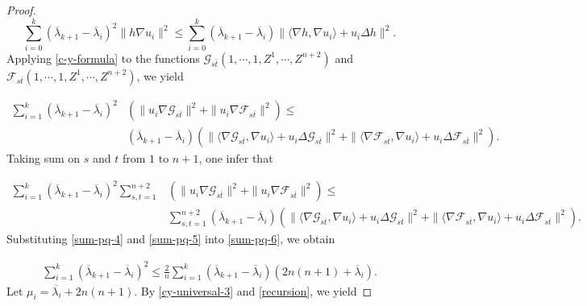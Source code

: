 \documentclass[12pt]{article}
\numberwithin{equation}{section}
\begin{document}
\begin{proof}
\begin{equation}\label{c-y-formula}\sum^{k}_{i=0}(\overline{\lambda}_{k+1}-\overline{\lambda}_{i})^{2}\|h\nabla u_{i}\|^{2}\leq\sum^{k}_{i=0}
(\overline{\lambda}_{k+1}-\overline{\lambda}_{i})\|\langle\nabla h,\nabla u_{i}\rangle+u_{i}\Delta h\|^{2}.\end{equation}
Applying \eqref{c-y-formula} to the functions $\mathcal{G}_{s\overline{t}}(1,\cdots,1,Z^{1},\cdots,Z^{n+2})$
and $\mathcal{F}_{s\overline{t}}(1,\cdots,1,Z^{1},\cdots,Z^{n+2})$, we yield

\begin{equation*}\begin{aligned}
\sum^{k}_{i=1}\left(\overline{\lambda}_{k+1}-\overline{\lambda}_{i}\right)^{2}&\left(\|u_{i}\nabla \mathcal{G}_{s\overline{t}}\|^{2}
+\|u_{i}\nabla \mathcal{F}_{s\overline{t}}\|^{2}\right)\leq\\&
\left(\overline{\lambda}_{k+1}-\overline{\lambda}_{i}\right)\left(\|\langle\nabla \mathcal{G}_{s\overline{t}},\nabla u_{i}\rangle
+u_{i}\Delta \mathcal{G}_{s\overline{t}}\|^{2}+\|\langle\nabla \mathcal{F}_{s\overline{t}},\nabla u_{i}\rangle+u_{i}\Delta \mathcal{F}_{s\overline{t}}\|^{2}\right)
.
\end{aligned}\end{equation*} Taking sum on $s$ and $t$
from $1$ to $n+1$, one infer that

\begin{equation}\begin{aligned}\label{sum-pq-6}
\sum^{k}_{i=1}\left(\overline{\lambda}_{k+1}-\overline{\lambda}_{i}\right)^{2}\sum^{n+2}_{s,t=1}&\left(\|u_{i}\nabla \mathcal{G}_{s\overline{t}}\|^{2}+\|u_{i}\nabla \mathcal{F}_{s\overline{t}}\|^{2}\right)\leq\\&
\sum^{n+2}_{s,t=1}\left(\overline{\lambda}_{k+1}-\overline{\lambda}_{i}\right)\left(\|\langle\nabla \mathcal{G}_{s\overline{t}},\nabla u_{i}\rangle+u_{i}\Delta \mathcal{G}_{s\overline{t}}\|^{2}+\|\langle\nabla \mathcal{F}_{s\overline{t}},\nabla u_{i}\rangle+u_{i}\Delta \mathcal{F}_{s\overline{t}}\|^{2}\right)
.
\end{aligned}\end{equation}
Substituting \eqref{sum-pq-4} and \eqref{sum-pq-5} into \eqref{sum-pq-6}, we obtain

\begin{equation}\begin{aligned}\label{cy-universal-3}
\sum^{k}_{i=1}\left(\overline{\lambda}_{k+1}-\overline{\lambda}_{i}\right)^{2}\leq
\frac{2}{n}\sum^{k}_{i=1}\left(\overline{\lambda}_{k+1}-\overline{\lambda}_{i}\right)\left(2n(n+1)+\overline{\lambda}_{i}\right)
.
\end{aligned}\end{equation}Let  $\mu_{i}=\overline{\lambda_{i}}+2n(n+1)$. By \eqref{cy-universal-3} and \eqref{recursion}, we yield




\end{proof}
\end{document}
